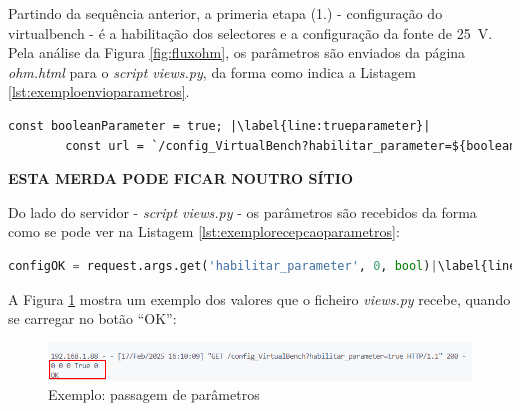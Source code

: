 Partindo da sequência anterior, a primeria etapa (1.) - configuração do \acrshort{virtualbench} - é a habilitação dos selectores e a configuração da fonte de \SI{25}{\volt}. Pela análise da Figura \ref{fig:fluxohm}, os parâmetros são enviados da página \textit{ohm.html} para o \textit{script views.py}, da forma como indica a Listagem \ref{lst:exemploenvioparametros}.

\begin{center}
	\begin{minipage}{0.9\linewidth}
		\begin{lstlisting}[language=Html,escapechar=|, caption=Envio de parâmetros da página \textit{ohm.html} para o \textit{script views.py}, label=lst:exemploenvioparametros]
		const booleanParameter = true; |\label{line:trueparameter}|
		const url = `/config_VirtualBench?habilitar_parameter=${booleanParameter.toString()}`
	\end{lstlisting}
	\end{minipage}
\end{center}

\textbf{ESTA MERDA PODE FICAR NOUTRO SÍTIO}

Do lado do servidor - \textit{script views.py} - os parâmetros são recebidos da forma como se pode ver na Listagem \ref{lst:exemplorecepcaoparametros}:
\begin{center}
	\begin{minipage}{1\linewidth}
		\begin{lstlisting}[language=Python,escapechar=|, caption=Recepção dos parâmetros no \textit{script views.py} enviados da página \textit{ohm.html}, label=lst:exemplorecepcaoparametros]
			configOK = request.args.get('habilitar_parameter', 0, bool)|\label{line:configOK}|
		\end{lstlisting}
	\end{minipage}
\end{center}


A Figura \ref{fig:passagemparametros} mostra um exemplo dos valores que o ficheiro \textit{views.py} recebe, quando se carregar no botão ``OK'':
\begin{figure}[hbtp]
	\centering
	\includegraphics[width=1\textwidth]{figures/exemplo_dados_Ohm.png}
	\caption{Exemplo: passagem de parâmetros}
	\label{fig:passagemparametros}
\end{figure}

